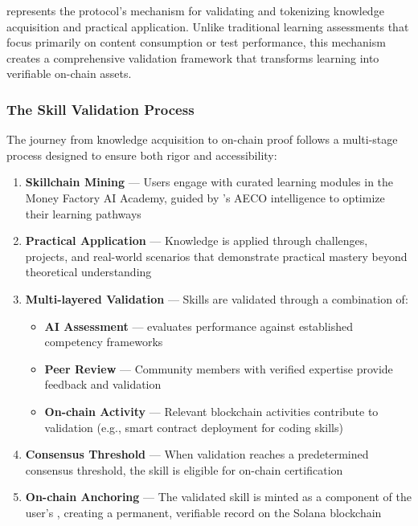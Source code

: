  represents the protocol's mechanism for validating and tokenizing knowledge acquisition and practical application. Unlike traditional learning assessments that focus primarily on content consumption or test performance, this mechanism creates a comprehensive validation framework that transforms learning into verifiable on-chain assets.

\subsubsection*{The Skill Validation Process}

The journey from knowledge acquisition to on-chain proof follows a multi-stage process designed to ensure both rigor and accessibility:

\begin{enumerate}
    \item \textbf{Skillchain Mining\texttrademark} — Users engage with curated learning modules in the Money Factory AI Academy, guided by 's AECO intelligence to optimize their learning pathways
    
    \item \textbf{Practical Application} — Knowledge is applied through challenges, projects, and real-world scenarios that demonstrate practical mastery beyond theoretical understanding
    
    \item \textbf{Multi-layered Validation} — Skills are validated through a combination of:
    \begin{itemize}
        \item \textbf{AI Assessment} —  evaluates performance against established competency frameworks
        \item \textbf{Peer Review} — Community members with verified expertise provide feedback and validation
        \item \textbf{On-chain Activity} — Relevant blockchain activities contribute to validation (e.g., smart contract deployment for coding skills)
    \end{itemize}
    
    \item \textbf{Consensus Threshold} — When validation reaches a predetermined consensus threshold, the skill is eligible for on-chain certification
    
    \item \textbf{On-chain Anchoring} — The validated skill is minted as a component of the user's , creating a permanent, verifiable record on the Solana blockchain
\end{enumerate}

